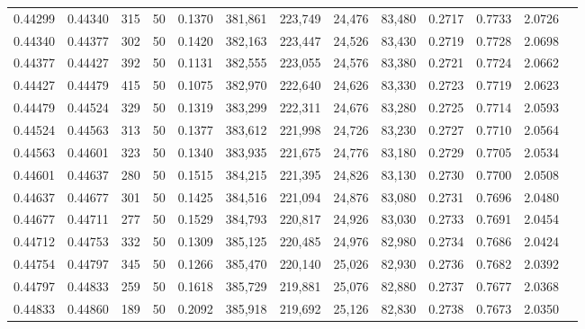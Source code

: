 \begin{tabular}{rrrrrrrrrrrrr}
0.44299 & 0.44340 &   315 &  50 &                                     0.1370 & 381,861 & 223,749 &  24,476 &  83,480 & 0.2717 & 0.7733 & 2.0726 \\
0.44340 & 0.44377 &   302 &  50 &                                     0.1420 & 382,163 & 223,447 &  24,526 &  83,430 & 0.2719 & 0.7728 & 2.0698 \\
0.44377 & 0.44427 &   392 &  50 &                                     0.1131 & 382,555 & 223,055 &  24,576 &  83,380 & 0.2721 & 0.7724 & 2.0662 \\
0.44427 & 0.44479 &   415 &  50 &                                     0.1075 & 382,970 & 222,640 &  24,626 &  83,330 & 0.2723 & 0.7719 & 2.0623 \\
0.44479 & 0.44524 &   329 &  50 &                                     0.1319 & 383,299 & 222,311 &  24,676 &  83,280 & 0.2725 & 0.7714 & 2.0593 \\
0.44524 & 0.44563 &   313 &  50 &                                     0.1377 & 383,612 & 221,998 &  24,726 &  83,230 & 0.2727 & 0.7710 & 2.0564 \\
0.44563 & 0.44601 &   323 &  50 &                                     0.1340 & 383,935 & 221,675 &  24,776 &  83,180 & 0.2729 & 0.7705 & 2.0534 \\
0.44601 & 0.44637 &   280 &  50 &                                     0.1515 & 384,215 & 221,395 &  24,826 &  83,130 & 0.2730 & 0.7700 & 2.0508 \\
0.44637 & 0.44677 &   301 &  50 &                                     0.1425 & 384,516 & 221,094 &  24,876 &  83,080 & 0.2731 & 0.7696 & 2.0480 \\
0.44677 & 0.44711 &   277 &  50 &                                     0.1529 & 384,793 & 220,817 &  24,926 &  83,030 & 0.2733 & 0.7691 & 2.0454 \\
0.44712 & 0.44753 &   332 &  50 &                                     0.1309 & 385,125 & 220,485 &  24,976 &  82,980 & 0.2734 & 0.7686 & 2.0424 \\
0.44754 & 0.44797 &   345 &  50 &                                     0.1266 & 385,470 & 220,140 &  25,026 &  82,930 & 0.2736 & 0.7682 & 2.0392 \\
0.44797 & 0.44833 &   259 &  50 &                                     0.1618 & 385,729 & 219,881 &  25,076 &  82,880 & 0.2737 & 0.7677 & 2.0368 \\
0.44833 & 0.44860 &   189 &  50 &                                     0.2092 & 385,918 & 219,692 &  25,126 &  82,830 & 0.2738 & 0.7673 & 2.0350 \\

\end{tabular}
